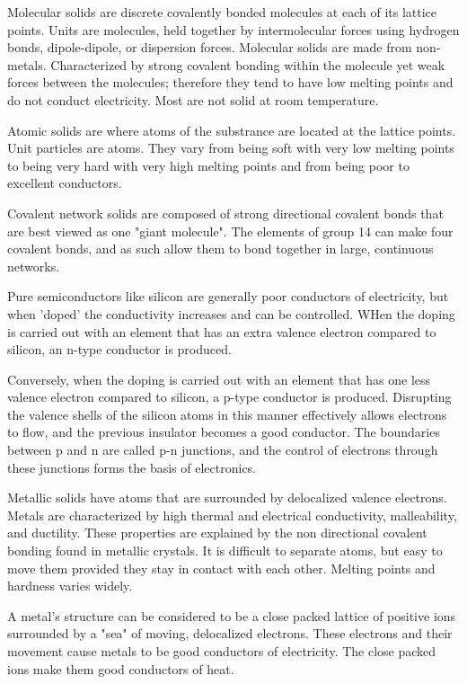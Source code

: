 \documentclass[../chem.tex]{subfiles}
\begin{document}
Molecular solids are discrete covalently bonded molecules at each of its lattice points. Units are molecules, held together by intermolecular 
forces using hydrogen bonds, dipole-dipole, or dispersion forces. Molecular solids are made from non-metals. Characterized by strong covalent bonding within 
the molecule yet weak forces between the molecules; therefore they tend to have low melting points and do not conduct electricity. Most are not solid at room temperature.

Atomic solids are where atoms of the substrance are located at the lattice points. Unit particles are atoms. They vary from being soft with very low melting points 
to being very hard with very high melting points and from being poor to excellent conductors.

Covalent network solids are composed of strong directional covalent bonds that are best viewed as one "giant molecule". The elements of group 14 can make 
four covalent bonds, and as such allow them to bond together in large, continuous networks.

Pure semiconductors like silicon are generally poor conductors of electricity, but when 'doped' the conductivity increases and can be controlled. 
WHen the doping is carried out with an element that has an extra valence electron compared to silicon, an n-type conductor is produced.

Conversely, when the doping is carried out with an element that has one less valence electron compared to silicon, a p-type conductor is produced. 
Disrupting the valence shells of the silicon atoms in this manner effectively allows electrons to flow, and the previous insulator becomes a good conductor.
The boundaries between p and n are called p-n junctions, and the control of electrons through these junctions forms the basis of electronics.

Metallic solids have atoms that are surrounded by delocalized valence electrons. Metals are characterized by high thermal and electrical conductivity, malleability, and ductility.
These properties are explained by the non directional covalent bonding found in metallic crystals. It is difficult to separate atoms, but easy to move them provided 
they stay in contact with each other. Melting points and hardness varies widely. 

A metal's structure can be considered to be a close packed lattice of positive ions surrounded by a "sea" of moving, delocalized electrons. These 
electrons and their movement cause metals to be good conductors of electricity. The close packed ions make them good conductors of heat.
\end{document}
